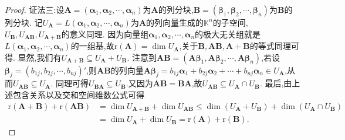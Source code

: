 \documentclass[../../main.tex]{subfiles}
\begin{document}
\begin{proof}
{\color{blue}证法三:}设\(\boldsymbol{A}=(\boldsymbol{\alpha}_1,\boldsymbol{\alpha}_2,\cdots,\boldsymbol{\alpha}_n)\)为\(\boldsymbol{A}\)的列分块,\(\boldsymbol{B}=(\boldsymbol{\beta}_1,\boldsymbol{\beta}_2,\cdots,\boldsymbol{\beta}_n)\)为\(\boldsymbol{B}\)的列分块. 记\(U_{\boldsymbol{A}} = L(\boldsymbol{\alpha}_1,\boldsymbol{\alpha}_2,\cdots,\boldsymbol{\alpha}_n)\)为\(\boldsymbol{A}\)的列向量生成的\(\mathbb{K}^n\)的子空间,\(U_{\boldsymbol{B}},U_{\boldsymbol{A}\boldsymbol{B}},U_{\boldsymbol{A}+\boldsymbol{B}}\)的意义同理. 因为向量组\(\boldsymbol{\alpha}_1,\boldsymbol{\alpha}_2,\cdots,\boldsymbol{\alpha}_n\)的极大无关组就是\(L(\boldsymbol{\alpha}_1,\boldsymbol{\alpha}_2,\cdots,\boldsymbol{\alpha}_n)\)的一组基,故\(\mathrm{r}(\boldsymbol{A})=\dim U_{\boldsymbol{A}}\),关于\(\boldsymbol{B},\boldsymbol{A}\boldsymbol{B},\boldsymbol{A}+\boldsymbol{B}\)的等式同理可得. 显然,我们有\(U_{\boldsymbol{A}+\boldsymbol{B}}\subseteq U_{\boldsymbol{A}}+U_{\boldsymbol{B}}\). 注意到\(\boldsymbol{A}\boldsymbol{B}=(\boldsymbol{A}\boldsymbol{\beta}_1,\boldsymbol{A}\boldsymbol{\beta}_2,\cdots,\boldsymbol{A}\boldsymbol{\beta}_n)\),若设\(\boldsymbol{\beta}_j=(b_{1j},b_{2j},\cdots,b_{nj})'\),则\(\boldsymbol{A}\boldsymbol{B}\)的列向量\(\boldsymbol{A}\boldsymbol{\beta}_j=b_{1j}\boldsymbol{\alpha}_1 + b_{2j}\boldsymbol{\alpha}_2+\cdots + b_{nj}\boldsymbol{\alpha}_n\in U_{\boldsymbol{A}}\),从而\(U_{\boldsymbol{A}\boldsymbol{B}}\subseteq U_{\boldsymbol{A}}\). 同理可得\(U_{\boldsymbol{B}\boldsymbol{A}}\subseteq U_{\boldsymbol{B}}\).又因为\(\boldsymbol{A}\boldsymbol{B}=\boldsymbol{B}\boldsymbol{A}\),故\(U_{\boldsymbol{A}\boldsymbol{B}}\subseteq U_{\boldsymbol{A}}\cap U_{\boldsymbol{B}}\). 最后,由上述包含关系以及交和空间维数公式可得
\begin{align*}
\mathrm{r}(\boldsymbol{A}+\boldsymbol{B})+\mathrm{r}(\boldsymbol{A}\boldsymbol{B})&=\dim U_{\boldsymbol{A}+\boldsymbol{B}}+\dim U_{\boldsymbol{A}\boldsymbol{B}}\leqslant \dim(U_{\boldsymbol{A}}+U_{\boldsymbol{B}})+\dim(U_{\boldsymbol{A}}\cap U_{\boldsymbol{B}})\\
&=\dim U_{\boldsymbol{A}}+\dim U_{\boldsymbol{B}}=\mathrm{r}(\boldsymbol{A})+\mathrm{r}(\boldsymbol{B}).
\end{align*}
\end{proof}
\end{document}
